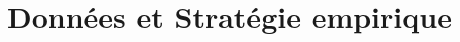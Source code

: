 \documentclass[xcolor=dvipsnames, aspectratio=169]{beamer}
\begin{document}



\section{Données et Stratégie empirique}
\end{document}

